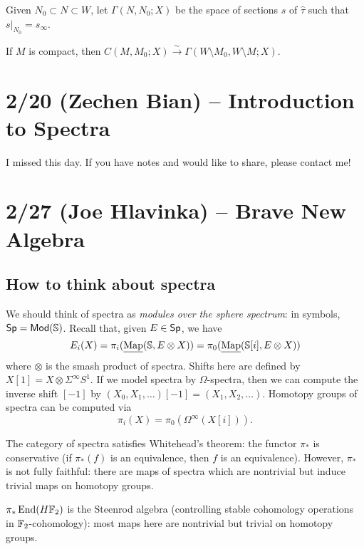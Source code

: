 \documentclass{article}
\begin{document}
\begin{dfn}
	Given $N_0 \subset N \subset W$, let $\Gamma(N, N_0; X)$ be the space of sections $s$ of $\hat{\tau}$ such that $s|_{N_0} = s_\infty$.
\end{dfn}

\begin{thm}
	If $M$ is compact, then $C(M, M_0; X) \xrightarrow{\sim} \Gamma(W \setminus M_0, W \setminus M; X)$.
\end{thm}

\section{2/20 (Zechen Bian) -- Introduction to Spectra}

I missed this day.
If you have notes and would like to share, please contact me!

\section{2/27 (Joe Hlavinka) -- Brave New Algebra}

\subsection{How to think about spectra}

We should think of spectra as \emph{modules over the sphere spectrum}: in symbols, $\mathsf{Sp} = \mathsf{Mod}(\mathbb{S})$.
Recall that, given $E \in \mathsf{Sp}$, we have
\[
	E_i(X) = \pi_i(\underline{\operatorname{Map}}(\mathbb{S}, E \otimes X)) = \pi_0(\underline{\operatorname{Map}}(\mathbb{S}[i], E \otimes X))
\]
where $\otimes$ is the smash product of spectra.
Shifts here are defined by $X[1] = X \otimes \Sigma^\infty S^1$.
If we model spectra by $\Omega$-spectra, then we can compute the inverse shift $[-1]$ by $(X_0, X_1, \dots)[-1] = (X_1, X_2, \dots)$.
Homotopy groups of spectra can be computed via
\[
	\pi_i(X) = \pi_0(\Omega^\infty(X[i])).
\]

The category of spectra satisfies Whitehead's theorem: the functor $\pi_*$ is conservative (if $\pi_*(f)$ is an equivalence, then $f$ is an equivalence).
However, $\pi_*$ is not fully faithful: there are maps of spectra which are nontrivial but induce trivial maps on homotopy groups.

\begin{ex}
	$\pi_* \operatorname{End}(H\mathbb{F}_2)$ is the Steenrod algebra (controlling stable cohomology operations in $\mathbb{F}_2$-cohomology): most maps here are nontrivial but trivial on homotopy groups.
\end{ex}
\end{document}
